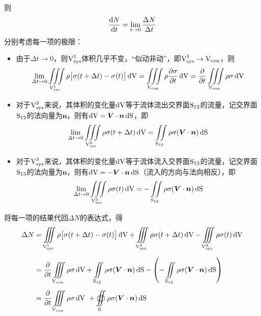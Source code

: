 则
\begin{equation}
	\dfrac{\d N}{\d t} = \lim\limits_{t \to 0} \dfrac{\Delta N}{\Delta t}
\end{equation}
分别考虑每一项的极限：\vspace*{-0.5em}
\begin{itemize}
	\item 由于$\Delta t \to 0$，则$\V_{\sys}^1$体积几乎不变，“似动非动”，即$\V_{\sys}^1 \to \V_{\con}$，则
	\begin{equation*}
		\lim\limits_{\Delta t \to 0} \iiint\limits_{\V_{\sys}^1} \rho \big[\sigma(t + \Delta t) - \sigma(t)\big]\, \d \V = \iiint\limits_ {\V_{\con}} \rho \dfrac{\partial \sigma}{\partial t} \, \d \V = \dfrac{\partial }{\partial t}\iiint\limits_ {\V_{\con}} \rho \sigma \, \d \V 
	\end{equation*}
	
	\item 对于$\V_{\sys}^2$来说，其体积的变化量$\d \V$等于流体流出交界面$\S_{12}$的流量，记交界面$\S_{12}$的法向量为$\bm{n}$，则有$\d \V = \bm{V} \cdot  \bm{n} \, \d \S$，即
	\begin{equation*}
		\lim\limits_{\Delta t \to 0} \iiint\limits_{\V_{\sys}^2} \rho \sigma(t + \Delta t)\, \d \V = \iint\limits_{\S_{12}} \rho \sigma (\bm{V} \cdot \bm{n})\, \d \S
	\end{equation*}
	
	\item 对于$\V_{\sys}^3$来说，其体积的变化量$\d \V$等于流体流入交界面$\S_{13}$的流量，记交界面$\S_{13}$的法向量为$\bm{n}$，则有$\d \V = - \bm{V} \cdot  \bm{n} \, \d \S$（流入的方向与法向相反），即
	\begin{equation*}
		\lim\limits_{\Delta t \to 0} \iiint\limits_{\V_{\sys}^3} \rho \sigma(t)\, \d \V = -\iint\limits_{\S_{13}} \rho \sigma (\bm{V} \cdot \bm{n})\, \d \S
	\end{equation*}
\end{itemize}
将每一项的结果代回$\Delta N$的表达式，得
\begin{align*}
	\Delta N & = \iiint\limits_{\V_{\sys}^1} \rho \big[\sigma(t + \Delta t) - \sigma(t)\big]\, \d \V + \iiint\limits_{\V_{\sys}^2} \rho \sigma(t + \Delta t)\, \d \V - \iiint\limits_{\V_{\sys}^3} \rho \sigma(t)\, \d \V \\[0.5em]
	& =  \dfrac{\partial }{\partial t}\iiint\limits_ {\V_{\con}} \rho \sigma \, \d \V + \iint\limits_{\S_{12}} \rho \sigma (\bm{V} \cdot \bm{n})\, \d \S - \left(-\iint\limits_{\S_{13}} \rho \sigma (\bm{V} \cdot \bm{n})\, \d \S \right) \\[0.5em]
	& = \dfrac{\partial }{\partial t}\iiint\limits_ {\V_{\con}} \rho \sigma \, \d \V \,\,+ \oiint\limits_{\S} \rho \sigma (\bm{V} \cdot \bm{n})\, \d \S  
\end{align*}

